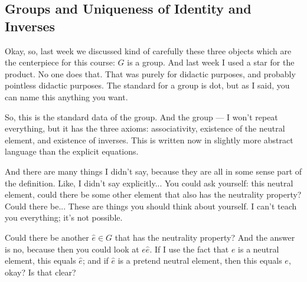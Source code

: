 \subsection{Groups and Uniqueness of Identity and Inverses}

\begin{speech}[00:01:48 - 00:03:20]
Okay, so, last week we discussed kind of carefully these three objects which are the centerpiece for this course: $G$ is a group.  And last week I used a star for the product. No one does that. That was purely for didactic purposes, and probably pointless didactic purposes. The standard for a group is dot, but as I said, you can name this anything you want.

So, this is the standard data of the group. And the group --- I won't repeat everything, but it has the three axioms:  associativity,  existence of the neutral element,  and existence of inverses.  This is written now in slightly more abstract language than the explicit equations.

And there are many things I didn't say, because they are all in some sense part of the definition. Like, I didn't say explicitly... You could ask yourself: this neutral element, could there be some other element that also has the neutrality property?  Could there be... These are things you should think about yourself. I can't teach you everything; it's not possible.

Could there be another $\hat{e} \in G$ that has the neutrality property? And the answer is no,  because then you could look at $e\hat{e}$.  If I use the fact that $e$ is a neutral element, this equals $\hat{e}$; and if $\hat{e}$ is a pretend neutral element, then this equals $e$, okay? Is that clear?
\end{speech}

